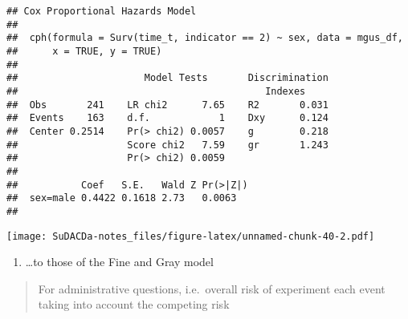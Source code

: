 \documentclass[]{book}
\newenvironment{Shaded}{\begin{snugshade}}{\end{snugshade}}
\newcommand{\KeywordTok}[1]{\textcolor[rgb]{0.13,0.29,0.53}{\textbf{{#1}}}}
\newcommand{\DataTypeTok}[1]{\textcolor[rgb]{0.13,0.29,0.53}{{#1}}}
\newcommand{\StringTok}[1]{\textcolor[rgb]{0.31,0.60,0.02}{{#1}}}
\newcommand{\NormalTok}[1]{{#1}}
\providecommand{\tightlist}{%
  \setlength{\itemsep}{0pt}\setlength{\parskip}{0pt}}
\theoremstyle{definition}
\theoremstyle{definition}
\theoremstyle{definition}
\theoremstyle{remark}
\begin{document}
\begin{verbatim}
## Cox Proportional Hazards Model
##  
##  cph(formula = Surv(time_t, indicator == 2) ~ sex, data = mgus_df, 
##      x = TRUE, y = TRUE)
##  
##                      Model Tests       Discrimination    
##                                           Indexes        
##  Obs       241    LR chi2      7.65    R2       0.031    
##  Events    163    d.f.            1    Dxy      0.124    
##  Center 0.2514    Pr(> chi2) 0.0057    g        0.218    
##                   Score chi2   7.59    gr       1.243    
##                   Pr(> chi2) 0.0059                      
##  
##           Coef   S.E.   Wald Z Pr(>|Z|)
##  sex=male 0.4422 0.1618 2.73   0.0063  
## 
\end{verbatim}

\begin{Shaded}
\end{Shaded}

\texttt{[image: SuDACDa-notes\_files/figure-latex/unnamed-chunk-40-2.pdf]}

\begin{enumerate}
\def\labelenumi{\arabic{enumi}.}
\setcounter{enumi}{1}
\tightlist
\item
  \ldots{}to those of the Fine and Gray model
\end{enumerate}

\begin{quote}
For administrative questions, i.e.~overall risk of experiment each event
taking into account the competing risk
\end{quote}

\begin{Shaded}
\end{Shaded}
\end{document}

